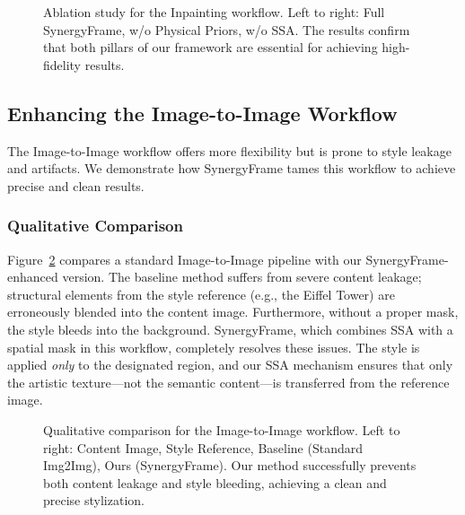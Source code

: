 \documentclass[letterpaper]{article} %
\begin{document}
\begin{figure}[h]
  \centering
  \caption{Ablation study for the Inpainting workflow. Left to right: Full SynergyFrame, w/o Physical Priors, w/o SSA. The results confirm that both pillars of our framework are essential for achieving high-fidelity results.}
  \label{fig:inpainting_ablation}
\end{figure}

\subsection{Enhancing the Image-to-Image Workflow}
\label{sec:exp_img2img}

The Image-to-Image workflow offers more flexibility but is prone to style leakage and artifacts. We demonstrate how SynergyFrame tames this workflow to achieve precise and clean results.

\subsubsection{Qualitative Comparison}
Figure~\ref{fig:img2img_comparison} compares a standard Image-to-Image pipeline with our SynergyFrame-enhanced version. The baseline method suffers from severe content leakage; structural elements from the style reference (e.g., the Eiffel Tower) are erroneously blended into the content image. Furthermore, without a proper mask, the style bleeds into the background. SynergyFrame, which combines SSA with a spatial mask in this workflow, completely resolves these issues. The style is applied \textit{only} to the designated region, and our SSA mechanism ensures that only the artistic texture—not the semantic content—is transferred from the reference image.

\begin{figure}[h]
  \centering
  \caption{Qualitative comparison for the Image-to-Image workflow. Left to right: Content Image, Style Reference, Baseline (Standard Img2Img), Ours (SynergyFrame). Our method successfully prevents both content leakage and style bleeding, achieving a clean and precise stylization.}
  \label{fig:img2img_comparison}
\end{figure}
\end{document}
